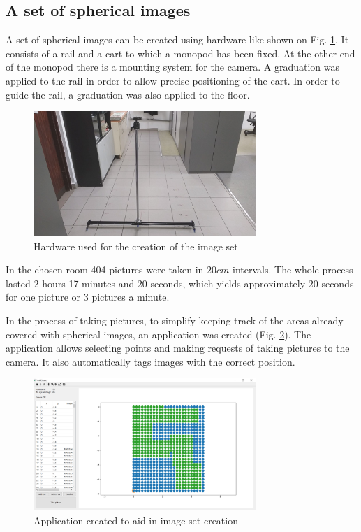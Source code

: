\documentclass{svproc}
\begin{document}
\subsection{A set of spherical images}



A set of spherical images can be created using hardware like shown on Fig. \ref{fig:rig}.
It consists of a rail and a cart to which a monopod has been fixed.
At the other end of the monopod there is a mounting system for the camera.
A graduation was applied to the rail in order to allow precise positioning of the cart.
In order to guide the rail, a graduation was also applied to the floor.
\begin{figure}[!ht]
    \centering
    \includegraphics[width=0.75\textwidth]{img/rig/calosc.jpg}
    \caption{Hardware used for the creation of the image set}
    \label{fig:rig}
\end{figure}
In the chosen room 404 pictures were taken in $20 cm$ intervals.
The whole process lasted 2 hours 17 minutes and 20 seconds, which yields approximately 20 seconds for one picture or 3 pictures a minute.

In the process of taking pictures, to simplify keeping track of the areas already covered with spherical images, an application was created (Fig. \ref{fig:app}).
The application allows selecting points and making requests of taking pictures to the camera.
It also automatically tags images with the correct position.
\begin{figure}[!ht]
    \centering
    \includegraphics[width=0.75\textwidth]{img/creator.png}
    \caption{Application created to aid in image set creation}
    \label{fig:app}
\end{figure}
\end{document}
